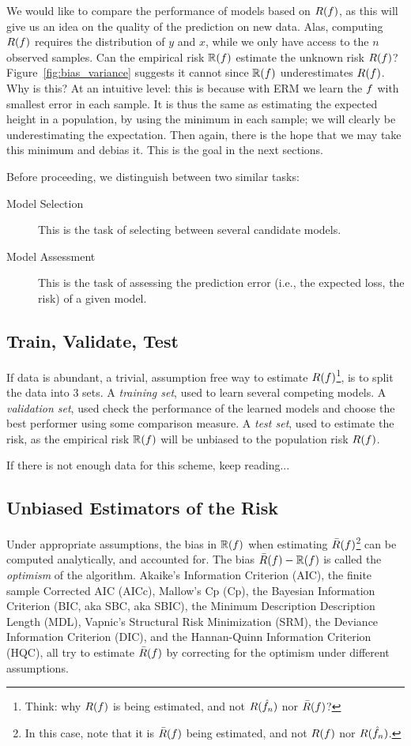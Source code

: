 We would like to compare the performance of models based on $R(f)$, as this will give us an idea on the quality of the prediction on new data. 
Alas, computing $R(f)$ requires the distribution of $y$ and $x$, while we only have access to the $n$ observed samples.
Can the empirical risk $\mathbb{R}(f)$ estimate the unknown risk $R(f)$? 
Figure~\ref{fig:bias_variance} suggests it cannot since $\mathbb{R}(f)$ underestimates $R(f)$.
Why is this?
At an intuitive level: this is because with ERM we learn the $f$ with smallest error in each sample.
It is thus the same as estimating the expected height in a population, by using the minimum in each sample; we will clearly be underestimating the expectation. Then again, there is the hope that we may take this minimum and debias it. 
This is the goal in the next sections.

Before proceeding, we distinguish between two similar tasks: 
\begin{description}
\item[Model Selection] This is the task of selecting between several candidate models.
\item[Model Assessment] This is the task of assessing the prediction error (i.e., the expected loss, the risk) of a given model.
\end{description}



\subsection{Train, Validate, Test}
\label{sec:train_test}
If data is abundant, a trivial, assumption free way to estimate $R(f)$\footnote{Think: why $R(f)$ is being estimated, and not $R(\hat{f}_n)$ nor $\bar{R}(f)$?}, is to split the data into $3$ sets.
A \emph{training set}, used to learn several competing models.
A \emph{validation set}, used check the performance of the learned models and choose the best performer using some comparison measure. 
A \emph{test set}, used to estimate the risk, as the empirical risk $\mathbb{R}(f)$ will be unbiased to the population risk $R(f)$.

If there is not enough data for this scheme, keep reading...


\subsection{Unbiased Estimators of the Risk}
\label{sec:risk_estimation}
Under appropriate assumptions, the bias in $\mathbb{R}(f)$ when estimating $\bar{R}(f)$\footnote{In this case, note that it is $\bar{R}(f)$ being estimated, and not $R(f)$ nor $R(\hat{f}_n)$.} can be computed analytically, and accounted for.
The bias $\bar{R}(f)-\mathbb{R}(f)$ is called the \emph{optimism} of the algorithm.
Akaike's Information Criterion (AIC), 
the finite sample Corrected AIC (AICc), 
Mallow's Cp (Cp), 
the Bayesian Information Criterion (BIC, aka SBC, aka SBIC), 
the Minimum Description Description Length (MDL), 
Vapnic's Structural Risk Minimization (SRM), 
the Deviance Information Criterion (DIC), 
and the Hannan-Quinn Information Criterion (HQC), 
all try to estimate $\bar{R}(f)$ by correcting for the optimism under different assumptions.

